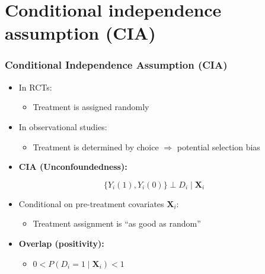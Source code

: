 \documentclass[12pt, compress]{beamer}
\begin{document}
\section{Conditional independence assumption (CIA)}
\begin{frame}
	\frametitle{Conditional Independence Assumption (CIA)}

\begin{itemize}
	\item In RCTs:
	\begin{itemize}
		\item Treatment is assigned randomly
	\end{itemize}
	
	\medskip
	
	\item In observational studies:
	\begin{itemize}
		\item Treatment is determined by choice $\Rightarrow$ potential selection bias
	\end{itemize}
	
	\medskip
	
	\item \textbf{CIA (Unconfoundedness):}
\end{itemize}

\[
\{ Y_i(1), Y_i(0) \} \perp D_i \mid \mathbf{X}_i
\]

\begin{itemize}
	\item Conditional on pre-treatment covariates $\mathbf{X}_i$:
	\begin{itemize}
		\item Treatment assignment is “as good as random”
	\end{itemize}
	
	\medskip
	
	\item \textbf{Overlap (positivity):}
	\begin{itemize}
		\item $0 < P(D_i = 1 \mid \mathbf{X}_i) < 1$
	\end{itemize}
\end{itemize}

\end{frame}
\end{document}
